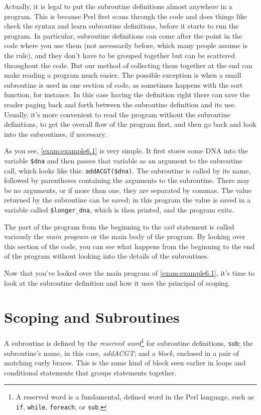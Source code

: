 Actually, it is legal to put the subroutine definitions almost anywhere in a program. This is because Perl first scans through the code and does things like check the syntax and learn subroutine definitions, before it starts to run the program. In particular, subroutine definitions can come after the point in the code where you use them (not necessarily before, which many people assume is the rule), and they don't have to be grouped together but can be scattered throughout the code. But our method of collecting them together at the end can make reading a program much easier. The possible exception is when a small subroutine is used in one section of code, as sometimes happens with the sort function, for instance. In this case having the definition right there can save the reader paging back and forth between the subroutine definition and its use. Usually, it's more convenient to read the program without the subroutine definitions, to get the overall flow of the program first, and then go back and look into the subroutines, if necessary.

As you see, \autoref{exam:example6.1} is very simple. It first stores some DNA into the variable \verb|$dna| and then passes that variable as an argument to the subroutine call, which looks like this: \verb|addACGT($dna)|. The subroutine is called by its name, followed by parentheses containing the arguments to the subroutine. There may be no arguments, or if more than one, they are separated by commas. The value returned by the subroutine can be saved; in this program the value is saved in a variable called \verb|$longer_dna|, which is then printed, and the program exits.  

The part of the program from the beginning to the \textit{exit} statement is called variously the \textit{main program} or the main body of the program. By looking over this section of the code, you can see what happens from the beginning to the end of the program without looking into the details of the subroutines.

Now that you've looked over the main program of \autoref{exam:example6.1}, it's time to look at the subroutine definition and how it uses the principal of scoping. 

\section{Scoping and Subroutines}
A subroutine is defined by the \textit{reserved word}\footnote{A reserved word is a fundamental, defined word in the Perl language, such as \verb|if|, \verb|while|, \verb|foreach|, or \verb|sub|.} for subroutine definitions, \verb|sub|; the subroutine's name, in this case, \textit{addACGT}; and a \textit{block}, enclosed in a pair of matching curly braces. This is the same kind of block seen earlier in loops and conditional statements that groups statements together.

